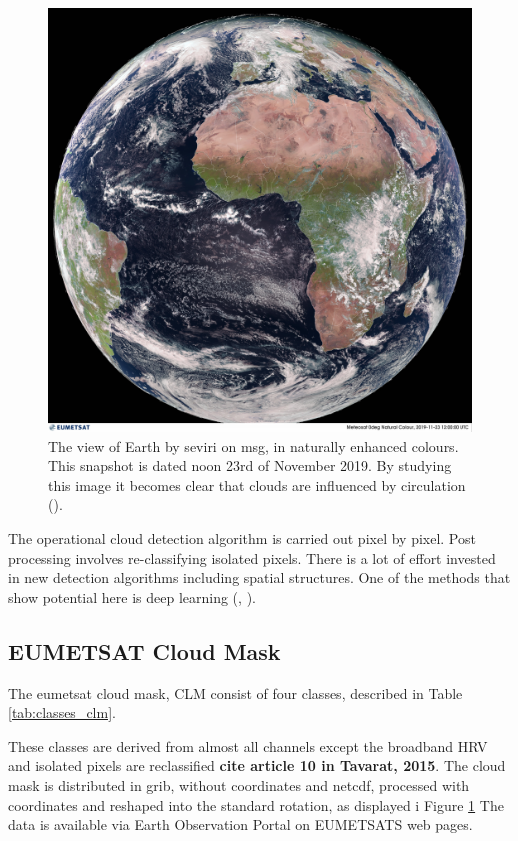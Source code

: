 \begin{figure}[h]
    \centering
    \includegraphics[scale=0.11]{Chapter2_Theory/images/MET10_RGBNatColourEnhncd_FullResolution_20191123120000.jpg}
    \caption{The view of Earth by \acrshort{seviri} on \acrshort{msg}, in naturally enhanced colours. This snapshot is dated noon 23rd of November 2019. By studying this image it becomes clear that clouds are influenced by circulation  (\cite{eumetcast_image_gallery}).}
    \label{fig:sat_view}
\end{figure}
The operational cloud detection algorithm is carried out pixel by pixel. Post processing involves re-classifying isolated pixels. There is a lot of effort invested in new detection algorithms including spatial structures. One of the methods that show potential here is deep learning (\cite{Dronner2018FastNetworks}, \cite{jeppesen_deep_cloud_masking}).

\subsection{EUMETSAT Cloud Mask} \label{sec:EUMETSAT_cloud_mask}
The \acrshort{eumetsat} cloud mask, CLM consist of four classes, described in Table \ref{tab:classes_clm}.


These classes are derived from almost all channels except the broadband HRV and isolated pixels are reclassified \textbf{cite article 10 in Tavarat, 2015}. The cloud mask is distributed in \acrfull{grib},  without coordinates and \acrfull{netcdf}, processed with coordinates and reshaped into the standard rotation, as displayed i Figure \ref{fig:sat_view} The data is available via Earth Observation Portal on EUMETSATS web pages. 

